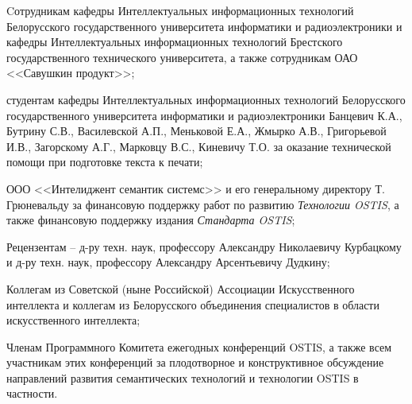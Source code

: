 \begin{SCn}
{\begin{scnitemize}
	\item Cотрудникам кафедры Интеллектуальных информационных технологий Белорусского государственного университета информатики и радиоэлектроники и кафедры Интеллектуальных информационных технологий Брестского государственного технического университета, а также сотрудникам ОАО <<Савушкин продукт>>;
	\item студентам кафедры Интеллектуальных информационных технологий Белорусского государственного университета информатики и радиоэлектроники Банцевич К.А., Бутрину С.В., Василевской А.П., Меньковой Е.А., Жмырко А.В., Григорьевой И.В., Загорскому А.Г., Марковцу В.С., Киневичу Т.О. за оказание технической помощи при подготовке текста к печати;
	\item ООО <<Интелиджент семантик системс>> и его генеральному директору Т. Грюневальду за финансовую поддержку работ по развитию \textit{Технологии OSTIS}, а также финансовую поддержку издания \textit{Стандарта OSTIS};
	\item Рецензентам -- д-ру техн. наук, профессору Александру Николаевичу Курбацкому и д-ру техн. наук, профессору Александру Арсентьевичу Дудкину;
	\item Коллегам из Советской (ныне Российской) Ассоциации Искусственного интеллекта и коллегам из Белорусского объединения специалистов в области искусственного интеллекта;
	\item Членам Программного Комитета ежегодных конференций OSTIS, а также всем участникам этих конференций за плодотворное и конструктивное обсуждение направлений развития семантических технологий и технологии OSTIS в частности.
\end{scnitemize}}

\scniselement{\scnstartsetlocal\scnendstructlocal}

\newpage

\end{SCn}
